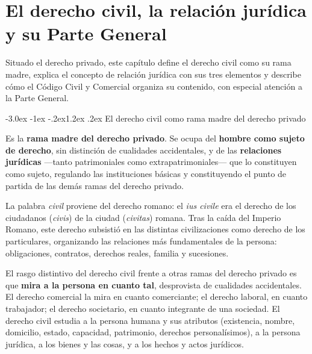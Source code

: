 \documentclass[12pt,oneside]{book}
\makeatletter
\renewcommand\section{\@startsection{section}{1}{\z@}%
  {-3.0ex \@plus -1ex \@minus -.2ex}{1.2ex \@plus .2ex}%
  {\normalfont\large\bfseries\color{acento}}}
\makeatother
\begin{document}

\chapter{El derecho civil, la relación jurídica y su Parte General}
\label{cap:civil}

Situado el derecho privado, este capítulo define el derecho civil como su rama madre, explica el concepto de relación jurídica con sus tres elementos y describe cómo el Código Civil y Comercial organiza su contenido, con especial atención a la Parte General.

\section{El derecho civil como rama madre del derecho privado}

\begin{definicion}
Es la \textbf{rama madre del derecho privado}. Se ocupa del \textbf{hombre como sujeto de derecho}, sin distinción de cualidades accidentales, y de las \textbf{relaciones jurídicas} ---tanto patrimoniales como extrapatrimoniales--- que lo constituyen como sujeto, regulando las instituciones básicas y constituyendo el punto de partida de las demás ramas del derecho privado.
\end{definicion}

La palabra \textit{civil} proviene del derecho romano: el \textit{ius civile} era el derecho de los ciudadanos (\textit{civis}) de la ciudad (\textit{civitas}) romana. Tras la caída del Imperio Romano, este derecho subsistió en las distintas civilizaciones como derecho de los particulares, organizando las relaciones más fundamentales de la persona: obligaciones, contratos, derechos reales, familia y sucesiones.

\begin{importante}
El rasgo distintivo del derecho civil frente a otras ramas del derecho privado es que \textbf{mira a la persona en cuanto tal}, desprovista de cualidades accidentales. El derecho comercial la mira en cuanto comerciante; el derecho laboral, en cuanto trabajador; el derecho societario, en cuanto integrante de una sociedad. El derecho civil estudia a la persona humana y sus atributos (existencia, nombre, domicilio, estado, capacidad, patrimonio, derechos personalísimos), a la persona jurídica, a los bienes y las cosas, y a los hechos y actos jurídicos.
\end{importante}
\end{document}
